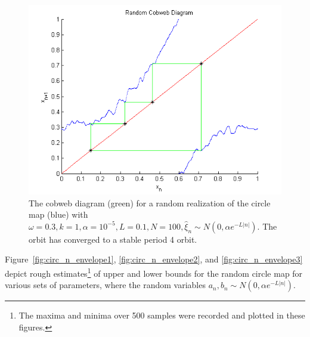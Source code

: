 \begin{figure}[htp]
\caption[Random circle map, stable orbit under the normal distribution]{The cobweb
  diagram (green) for a random realization of the circle map (blue) with $\omega =
  0.3, k=1, \alpha = 10^{-5}, L=0.1, N=100, \hat{\xi}_n \sim N(0,\alpha e^{-L|n|})$. The orbit has converged to a stable period 4 orbit.}\label{fig:rcircstable_norm}
	\begin{center}
		\includegraphics[scale=0.65]{figs/randcirc_norm_cobweb.png}
	\end{center}
\end{figure}
Figure~\ref{fig:circ_n_envelope1}, \ref{fig:circ_n_envelope2}, and \ref{fig:circ_n_envelope3} depict rough estimates\footnote{The
  maxima and minima over 500 samples were recorded and plotted in
  these figures.} of upper and lower bounds for the random circle map
for various sets of parameters, where the random variables
$a_n,b_n\sim N(0,\alpha e^{-L|n|})$.
